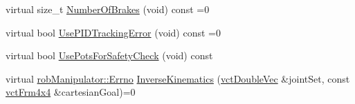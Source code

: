 \begin{DoxyCompactItemize}
\item 
virtual size\-\_\-t \hyperlink{classmts_intuitive_research_kit_arm_af5aeb301791a6d88509deb924d63c37d}{Number\-Of\-Brakes} (void) const =0
\item 
virtual bool \hyperlink{classmts_intuitive_research_kit_arm_ac070e316cba6d7bfedc2ac1b461b7aa7}{Use\-P\-I\-D\-Tracking\-Error} (void) const =0
\item 
virtual bool \hyperlink{classmts_intuitive_research_kit_arm_a066ec46121a6a571b1ed3a851774a069}{Use\-Pots\-For\-Safety\-Check} (void) const 
\item 
virtual \hyperlink{classrob_manipulator_a7bbb51cdb81c9c681075a9274ca0cdc0}{rob\-Manipulator\-::\-Errno} \hyperlink{classmts_intuitive_research_kit_arm_adc69000cac52a74b4152f41e4e936bd4}{Inverse\-Kinematics} (\hyperlink{vct_dynamic_vector_types_8h_ade4b3068c86fb88f41af2e5187e491c2}{vct\-Double\-Vec} \&joint\-Set, const \hyperlink{vct_transformation_types_8h_a33da47f4deb2556b37a69a2c44b29d75}{vct\-Frm4x4} \&cartesian\-Goal)=0
\end{DoxyCompactItemize}
